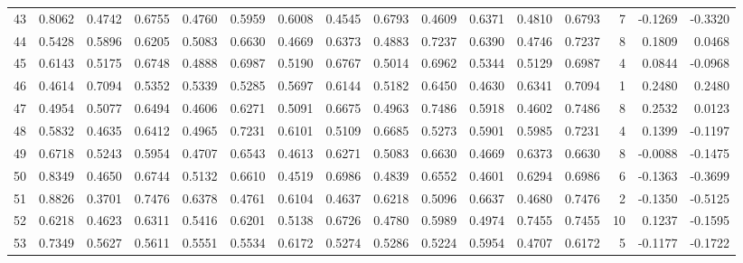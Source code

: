 \begin{tabular}{lrrrrrrrrrrrrrrr}
43  &      0.8062 &  0.4742 &  0.6755 &  0.4760 &  0.5959 &  0.6008 &  0.4545 &  0.6793 &  0.4609 &  0.6371 &   0.4810 &     0.6793 &      7 &                   -0.1269 &                    -0.3320 \\
44  &      0.5428 &  0.5896 &  0.6205 &  0.5083 &  0.6630 &  0.4669 &  0.6373 &  0.4883 &  0.7237 &  0.6390 &   0.4746 &     0.7237 &      8 &                    0.1809 &                     0.0468 \\
45  &      0.6143 &  0.5175 &  0.6748 &  0.4888 &  0.6987 &  0.5190 &  0.6767 &  0.5014 &  0.6962 &  0.5344 &   0.5129 &     0.6987 &      4 &                    0.0844 &                    -0.0968 \\
46  &      0.4614 &  0.7094 &  0.5352 &  0.5339 &  0.5285 &  0.5697 &  0.6144 &  0.5182 &  0.6450 &  0.4630 &   0.6341 &     0.7094 &      1 &                    0.2480 &                     0.2480 \\
47  &      0.4954 &  0.5077 &  0.6494 &  0.4606 &  0.6271 &  0.5091 &  0.6675 &  0.4963 &  0.7486 &  0.5918 &   0.4602 &     0.7486 &      8 &                    0.2532 &                     0.0123 \\
48  &      0.5832 &  0.4635 &  0.6412 &  0.4965 &  0.7231 &  0.6101 &  0.5109 &  0.6685 &  0.5273 &  0.5901 &   0.5985 &     0.7231 &      4 &                    0.1399 &                    -0.1197 \\
49  &      0.6718 &  0.5243 &  0.5954 &  0.4707 &  0.6543 &  0.4613 &  0.6271 &  0.5083 &  0.6630 &  0.4669 &   0.6373 &     0.6630 &      8 &                   -0.0088 &                    -0.1475 \\
50  &      0.8349 &  0.4650 &  0.6744 &  0.5132 &  0.6610 &  0.4519 &  0.6986 &  0.4839 &  0.6552 &  0.4601 &   0.6294 &     0.6986 &      6 &                   -0.1363 &                    -0.3699 \\
51  &      0.8826 &  0.3701 &  0.7476 &  0.6378 &  0.4761 &  0.6104 &  0.4637 &  0.6218 &  0.5096 &  0.6637 &   0.4680 &     0.7476 &      2 &                   -0.1350 &                    -0.5125 \\
52  &      0.6218 &  0.4623 &  0.6311 &  0.5416 &  0.6201 &  0.5138 &  0.6726 &  0.4780 &  0.5989 &  0.4974 &   0.7455 &     0.7455 &     10 &                    0.1237 &                    -0.1595 \\
53  &      0.7349 &  0.5627 &  0.5611 &  0.5551 &  0.5534 &  0.6172 &  0.5274 &  0.5286 &  0.5224 &  0.5954 &   0.4707 &     0.6172 &      5 &                   -0.1177 &                    -0.1722 \\

\end{tabular}
